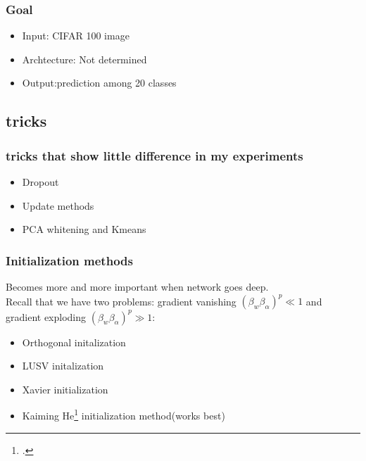 \documentclass{beamer}
\begin{document}
\begin{frame}
\frametitle{Goal}
\begin{itemize}
\item Input: CIFAR 100 image
\item Archtecture: Not determined
\item Output:prediction among 20 classes
\end{itemize}
\end{frame}

\subsection{tricks}
\begin{frame}
\frametitle{tricks that show little difference in my experiments}
\begin{itemize}
\item Dropout
\item Update methods
\item PCA whitening and Kmeans
\end{itemize}
\end{frame}


\begin{frame}
\frametitle{Initialization methods}
Becomes more and more important when network goes deep.\\
Recall that we have two problems: gradient vanishing $(\beta _w \beta _\alpha)^p\ll 1$ and gradient exploding $(\beta _w \beta _\alpha)^p\gg 1$: 
\begin{itemize}
\item Orthogonal initalization
\item LUSV initalization
\item Xavier initialization
\item Kaiming He\footcite{he2015delving} initialization method({\color{red}works best})
\end{itemize}
\end{frame}
\end{document}
